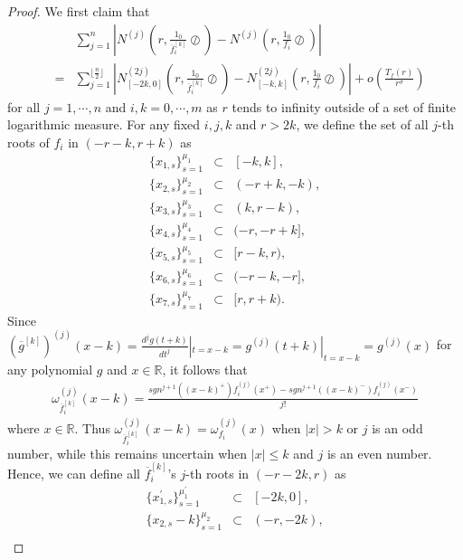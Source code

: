 \documentclass{article}
\begin{document}
\begin{proof}
    We first claim that
    \begin{eqnarray}\label{equa1}
    &&\sum_{j=1}^{n}\left|N^{(j)}\left(r, \frac{1_{0}}{\overline{f}_{i}^{[k]}}\oslash\right)-N^{(j)}\left(r, \frac{1_{0}}{f_{i}}\oslash\right)\right|\nonumber\\
    &=& \sum_{j=1}^{\lfloor \frac{n}{2}\rfloor}\left|N_{[-2k, 0]}^{(2j)}\left(r, \frac{1_{0}}{\overline{f}_{i}^{[k]}}\oslash\right)-N_{[-k, k]}^{(2j)}\left(r, \frac{1_{0}}{f_{i}}\oslash\right)\right| +o\left(\frac{T_{f}(r)}{r^{\sigma}}\right)
    \end{eqnarray}
    for all $j=1, \cdots, n$ and $i, k=0, \cdots, m$ as $r$ tends to infinity outside of a set of finite logarithmic measure. For any fixed $i, j, k$ and $r>2k$, we define the set of all $j$-th roots of $f_{i}$ in $(-r-k, r+k)$ as
    \begin{eqnarray*}
        \{x_{1,s}\}_{s=1}^{\mu_{1}}&\subset& [-k, k], \\
        \{x_{2,s}\}_{s=1}^{\mu_{2}}&\subset& (-r+k, -k),\\
        \{x_{3,s}\}_{s=1}^{\mu_{3}}&\subset& (k, r-k),\\
        \{x_{4,s}\}_{s=1}^{\mu_{4}}&\subset& (-r, -r+k],\\
        \{x_{5,s}\}_{s=1}^{\mu_{5}}&\subset& [r-k, r),\\
        \{x_{6,s}\}_{s=1}^{\mu_{6}}&\subset& (-r-k, -r],\\
        \{x_{7,s}\}_{s=1}^{\mu_{7}}&\subset& [r, r+k).
    \end{eqnarray*}
    Since $\left(\overline{g}^{[k]}\right)^{(j)}(x-k)=\frac{d^{j}g(t+k)}{dt^{j}}|_{t=x-k}=g^{(j)}(t+k)|_{t=x-k}=g^{(j)}(x)$ for any polynomial $g$ and $x\in\mathbb{R}$, it follows that
    \begin{eqnarray*}
        \omega_{\overline{f}_{i}^{[k]}}^{(j)}(x-k)=\frac{sgn^{j+1}((x-k)^{+})f_{i}^{(j)}(x^{+})-sgn^{j+1}((x-k)^{-})f_{i}^{(j)}(x^{-})}{j!}
    \end{eqnarray*}
    where $x\in\mathbb{R}$. Thus $\omega_{\overline{f}_{i}^{[k]}}^{(j)}(x-k)=\omega_{f_{i}}^{(j)}(x)$ when $|x|>k$ or $j$ is an odd number, while this remains uncertain when $|x|\leq k$ and $j$ is an even number. Hence, we can define all $\overline{f}_{i}^{[k]}$'s $j$-th roots in $(-r-2k, r)$ as
    \begin{eqnarray*}
        \{x_{1,s}^{'}\}_{s=1}^{\mu_{1}^{'}}&\subset& [-2k, 0], \\
        \{x_{2,s}-k\}_{s=1}^{\mu_{2}}&\subset& (-r, -2k),\\

\end{eqnarray*}
\end{proof}
\end{document}
